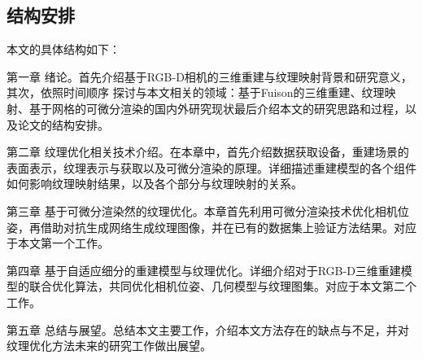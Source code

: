 \subsection{结构安排}


本文的具体结构如下： \par
第一章 绪论。首先介绍基于RGB-D相机的三维重建与纹理映射背景和研究意义，其次，依照时间顺序
探讨与本文相关的领域：基于Fuison的三维重建、纹理映射、基于网格的可微分渲染的国内外研究现状最后介绍本文的研究思路和过程，以及论文的结构安排。\par
第二章 纹理优化相关技术介绍。在本章中，首先介绍数据获取设备，重建场景的表面表示，纹理表示与获取以及可微分渲染的原理。详细描述重建模型的各个组件如何影响纹理映射结果，以及各个部分与纹理映射的关系。\par

第三章 基于可微分渲染然的纹理优化。本章首先利用可微分渲染技术优化相机位姿，再借助对抗生成网络生成纹理图像，并在已有的数据集上验证方法结果。对应于本文第一个工作。\par

第四章 基于自适应细分的重建模型与纹理优化。详细介绍对于RGB-D三维重建模型的联合优化算法，共同优化相机位姿、几何模型与纹理图集。对应于本文第二个工作。\par

第五章 总结与展望。总结本文主要工作，介绍本文方法存在的缺点与不足，并对纹理优化方法未来的研究工作做出展望。

